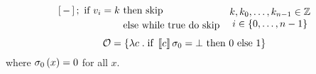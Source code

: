 \begin{enumcirc}
\begin{example}
\[{\begin{array}{c}
{\begin{aligned}
							\left[ \, - \, \right]; \textrm{ if } v_i = k & \textrm{ then } \textrm{skip}\\
							                                    & \textrm{ else } \textrm{while } \textrm{true} \textrm{ do } \textrm{skip}\end{aligned}
					}
				\end{array}
			}{
				\begin{array}{c}
					k, k_0, \dots , k_{n-1} \in \mathbb{Z} \\
					i \in \left\{ 0, \dots , n-1 \right\}
				\end{array}
			}
		\]
		\vspace{1em}
		\[
			\mathcal{O} = \left\{ \lambda c \;.\; \textrm{if } \left\llbracket c \right\rrbracket \sigma_0 = \bot \textrm{ then } 0 \textrm{ else } 1 \right\}
		\]
		where $\sigma_0 \left( x \right) = 0$ for all $x$.
	\end{example}

\end{enumcirc}